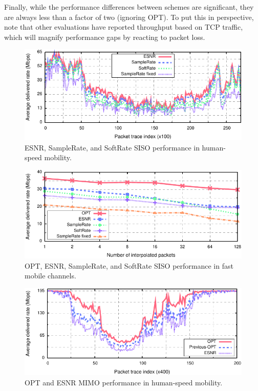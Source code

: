 Finally, while the performance differences between schemes are significant, they are always less than a factor of two (ignoring OPT). To put this in perspective, note that other evaluations have reported throughput based on TCP traffic, which will magnify performance gaps by reacting to packet loss.


\begin{figure}[t]
      \centering
      \includegraphics[width=0.95\columnwidth]{figures/rate/siso_rate_time_opt_eff_sr_so.pdf}
      \caption{\label{fig:siso_rate_time_opt_eff_sr_so} ESNR, SampleRate, and SoftRate SISO performance in human-speed mobility.}
\end{figure}

\begin{figure}[t]
      \centering
      \includegraphics[width=0.95\columnwidth]{figures/rate/siso_rate_skip_opt_eff_sr_so.pdf}
      \caption{\label{fig:siso_rate_skip_opt_eff_sr_so} OPT, ESNR, SampleRate, and SoftRate SISO performance in fast mobile channels.}
\end{figure}


\begin{figure}[t]
      \centering
      \includegraphics[width=.95\columnwidth]{figures/rate/mimo_skip_time.pdf}
      \caption{\label{fig:mimo_eff_snr_time} OPT and ESNR MIMO performance in human-speed mobility.}
\end{figure}

